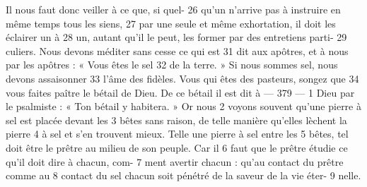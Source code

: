 Il nous faut donc veiller à ce que, si quel-	 
26	 	qu'un n'arrive pas à instruire en même temps tous les siens,	 
27	 	par une seule et même exhortation, il doit les éclairer un à	 
28	 	un, autant qu'il le peut, les former par des entretiens parti-	 
29	 	culiers. Nous devons méditer sans cesse ce qui est	 
31	 	dit aux apôtres, et à nous par les apôtres : « Vous êtes le sel	 
32	 	de la terre. » Si nous sommes sel, nous devons assaisonner	 
33	 	l'âme des fidèles. Vous qui êtes des pasteurs, songez que	 
34	 	vous faites paître le bétail de Dieu. De ce bétail il est dit à	 
 	--- 379 ---	 
1	 	Dieu par le psalmiste : « Ton bétail y habitera. » Or nous	 
2	 	voyons souvent qu'une pierre à sel est placée devant les	 
3	 	bêtes sans raison, de telle manière qu'elles lèchent la pierre	 
4	 	à sel et s'en trouvent mieux. Telle une pierre à sel entre les	 
5	 	bêtes, tel doit être le prêtre au milieu de son peuple. Car il	 
6	 	faut que le prêtre étudie ce qu'il doit dire à chacun, com-	 
7	 	ment avertir chacun : qu'au contact du prêtre comme au	 
8	 	contact du sel chacun soit pénétré de la saveur de la vie éter-	 
9	 	nelle. 